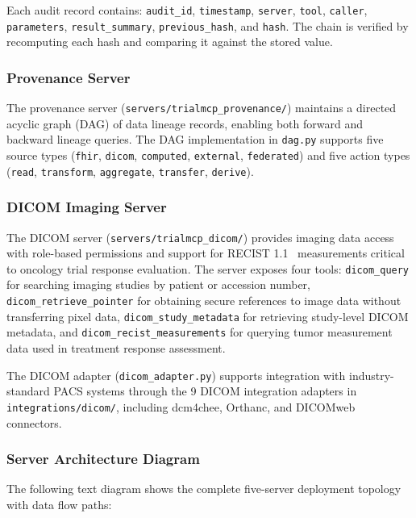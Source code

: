 Each audit record contains: \texttt{audit\_id}, \texttt{timestamp}, \texttt{server}, \texttt{tool}, \texttt{caller}, \texttt{parameters}, \texttt{result\_summary}, \texttt{previous\_hash}, and \texttt{hash}. The chain is verified by recomputing each hash and comparing it against the stored value.

\subsubsection{Provenance Server}

The provenance server (\texttt{servers/trialmcp\_provenance/}) maintains a directed acyclic graph (DAG) of data lineage records, enabling both forward and backward lineage queries. The DAG implementation in \texttt{dag.py} supports five source types (\texttt{fhir}, \texttt{dicom}, \texttt{computed}, \texttt{external}, \texttt{federated}) and five action types (\texttt{read}, \texttt{transform}, \texttt{aggregate}, \texttt{transfer}, \texttt{derive}).

\subsubsection{DICOM Imaging Server}

The DICOM server (\texttt{servers/trialmcp\_dicom/}) provides imaging data access with role-based permissions and support for RECIST 1.1~\cite{eisenhauer2009recist} measurements critical to oncology trial response evaluation. The server exposes four tools: \texttt{dicom\_query} for searching imaging studies by patient or accession number, \texttt{dicom\_retrieve\_pointer} for obtaining secure references to image data without transferring pixel data, \texttt{dicom\_study\_metadata} for retrieving study-level DICOM metadata, and \texttt{dicom\_recist\_measurements} for querying tumor measurement data used in treatment response assessment.

The DICOM adapter (\texttt{dicom\_adapter.py}) supports integration with industry-standard PACS systems through the 9 DICOM integration adapters in \texttt{integrations/dicom/}, including dcm4chee, Orthanc, and DICOMweb connectors.

\subsubsection{Server Architecture Diagram}

The following text diagram shows the complete five-server deployment topology with data flow paths:

